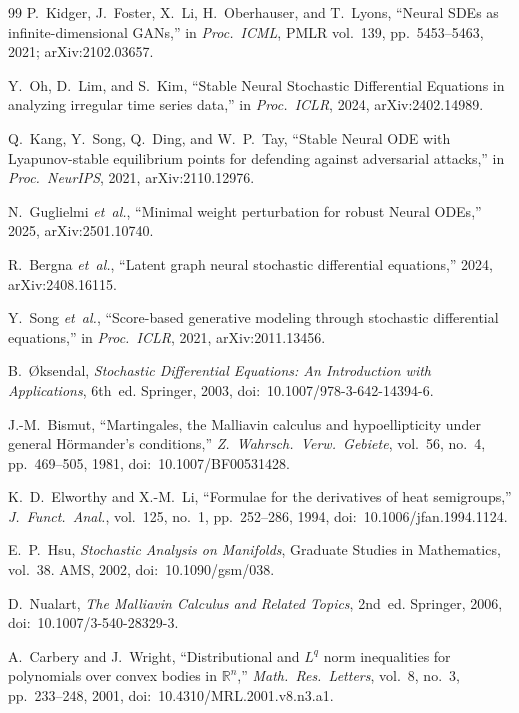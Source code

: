 \documentclass{ieeeaccess}
\begin{document}
\begin{thebibliography}{99}
 P.~Kidger, J.~Foster, X.~Li, H.~Oberhauser,
and T.~Lyons, ``Neural SDEs as infinite-dimensional GANs,''
in \emph{Proc.\ ICML}, PMLR vol.~139, pp.~5453--5463, 2021;
arXiv:2102.03657.

 Y.~Oh, D.~Lim, and S.~Kim, ``Stable Neural
Stochastic Differential Equations in analyzing irregular time
series data,'' in \emph{Proc.\ ICLR}, 2024, arXiv:2402.14989.

 Q.~Kang, Y.~Song, Q.~Ding, and W.~P.~Tay,
``Stable Neural ODE with Lyapunov-stable equilibrium points for
defending against adversarial attacks,'' in \emph{Proc.\ NeurIPS}, 2021,
arXiv:2110.12976.

 N.~Guglielmi \textit{et~al.},
``Minimal weight perturbation for robust Neural ODEs,'' 2025,
arXiv:2501.10740.

 R.~Bergna \textit{et~al.},
``Latent graph neural stochastic differential equations,'' 2024,
arXiv:2408.16115.

 Y.~Song \textit{et~al.}, ``Score-based
generative modeling through stochastic differential equations,''
in \emph{Proc.\ ICLR}, 2021, arXiv:2011.13456.

 B.~\O{}ksendal, \emph{Stochastic Differential
Equations: An Introduction with Applications}, 6th~ed. Springer, 2003,
doi:~10.1007/978-3-642-14394-6.

 J.-M.~Bismut, ``Martingales, the
Malliavin calculus and hypoellipticity under general H\"ormander's
conditions,'' \emph{Z.\ Wahrsch.\ Verw.\ Gebiete}, vol.~56, no.~4,
pp.~469--505, 1981, doi:~10.1007/BF00531428.

 K.~D.~Elworthy and X.-M.~Li,
``Formulae for the derivatives of heat semigroups,''
\emph{J.\ Funct.\ Anal.}, vol.~125, no.~1, pp.~252--286, 1994,
doi:~10.1006/jfan.1994.1124.

 E.~P.~Hsu, \emph{Stochastic Analysis on Manifolds},
Graduate Studies in Mathematics, vol.~38. AMS, 2002,
doi:~10.1090/gsm/038.

 D.~Nualart, \emph{The Malliavin
Calculus and Related Topics}, 2nd~ed. Springer, 2006,
doi:~10.1007/3-540-28329-3.

 A.~Carbery and J.~Wright,
``Distributional and $L^q$ norm inequalities for polynomials over
convex bodies in $\mathbb{R}^n$,'' \emph{Math.\ Res.\ Letters},
vol.~8, no.~3, pp.~233--248, 2001, doi:~10.4310/MRL.2001.v8.n3.a1.


\end{thebibliography}
\end{document}
